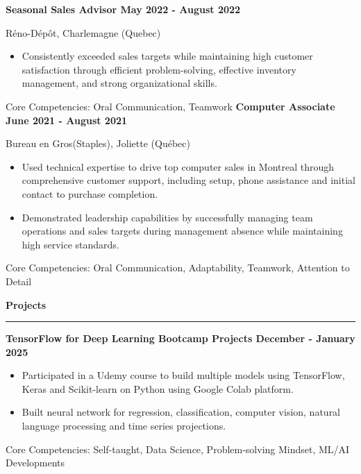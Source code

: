 \documentclass[letterpaper,11pt]{article}
\begin{document}
\textbf{Seasonal Sales Advisor \hfill May 2022 - August 2022}
\par
\vspace{-15pt}
Réno-Dépôt, Charlemagne (Quebec)

\begin{itemize}
\setlength{\itemsep}{-3pt}
\item 
Consistently exceeded sales targets while maintaining high customer satisfaction through efficient problem-solving, effective inventory management, and strong organizational skills.
\end{itemize}

Core Competencies: Oral Communication, Teamwork
\vspace{-5pt}
\textbf{Computer Associate} \hfill \textbf{June 2021 - August 2021} 
\par
\vspace{-15pt}
Bureau en Gros(Staples), Joliette (Québec)

\begin{itemize}
\setlength{\itemsep}{-3pt}
\item
Used technical expertise to drive top computer sales in Montreal through comprehensive customer support, including setup, phone assistance and initial contact to purchase completion.
\item
Demonstrated leadership capabilities by successfully managing team operations and sales targets during management absence while maintaining high service standards.
\end{itemize}
Core Competencies: Oral Communication, Adaptability, Teamwork, Attention
to Detail
\vspace{-5pt}

\textbf{Projects}\par
\vspace{-20pt}
\rule{\textwidth}{0.4pt}

\textbf{TensorFlow for Deep Learning Bootcamp Projects \hfill December - January 2025}
\begin{itemize}
\setlength{\itemsep}{-3pt}
\item
Participated in a Udemy course to build multiple models using TensorFlow, Keras and Scikit-learn on Python using Google Colab platform.
\item
Built neural network for regression, classification, computer vision, natural language processing and time series projections.
\end{itemize}
Core Competencies: Self-taught, Data Science, Problem-solving Mindset, ML/AI Developments
\end{document}
